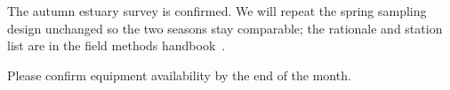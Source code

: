 \documentclass[11pt]{article}
\begin{document}

\noindent
The autumn estuary survey is confirmed. We will repeat the spring
sampling design unchanged so the two seasons stay comparable; the
rationale and station list are in the field methods
handbook~\cite{handbook2021}.

\medskip
\noindent
Please confirm equipment availability by the end of the month.

\printbibliography
\end{document}
